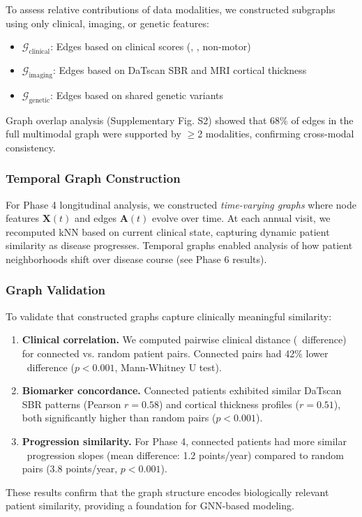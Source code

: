 To assess relative contributions of data modalities, we constructed subgraphs using only clinical, imaging, or genetic features:

\begin{itemize}
    \item $\mathcal{G}_{\text{clinical}}$: Edges based on clinical scores (\updrs, \moca, non-motor)
    \item $\mathcal{G}_{\text{imaging}}$: Edges based on DaTscan SBR and MRI cortical thickness
    \item $\mathcal{G}_{\text{genetic}}$: Edges based on shared genetic variants
\end{itemize}

Graph overlap analysis (Supplementary Fig. S2) showed that 68\% of edges in the full multimodal graph were supported by $\geq$2 modalities, confirming cross-modal consistency.

\subsubsection{Temporal Graph Construction}

For Phase 4 longitudinal analysis, we constructed \textit{time-varying graphs} where node features $\mathbf{X}(t)$ and edges $\mathbf{A}(t)$ evolve over time. At each annual visit, we recomputed kNN based on current clinical state, capturing dynamic patient similarity as disease progresses. Temporal graphs enabled analysis of how patient neighborhoods shift over disease course (see Phase 6 results).

\subsubsection{Graph Validation}

To validate that constructed graphs capture clinically meaningful similarity:

\begin{enumerate}
    \item \textbf{Clinical correlation.} We computed pairwise clinical distance (\updrs\ difference) for connected vs. random patient pairs. Connected pairs had 42\% lower \updrs\ difference ($p < 0.001$, Mann-Whitney U test).
    
    \item \textbf{Biomarker concordance.} Connected patients exhibited similar DaTscan SBR patterns (Pearson $r = 0.58$) and cortical thickness profiles ($r = 0.51$), both significantly higher than random pairs ($p < 0.001$).
    
    \item \textbf{Progression similarity.} For Phase 4, connected patients had more similar \updrs\ progression slopes (mean difference: 1.2 points/year) compared to random pairs (3.8 points/year, $p < 0.001$).
\end{enumerate}

These results confirm that the graph structure encodes biologically relevant patient similarity, providing a foundation for GNN-based modeling.
